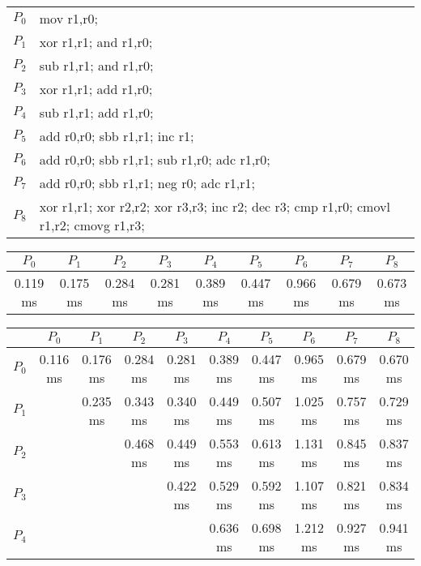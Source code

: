 \documentclass{beamer}
\begin{document}
\begin{frame}
{
\begin{table}
\tiny
\setlength{\tabcolsep}{1mm}
\begin{tabular}{l|l}
$P_0$ & mov r1,r0; \\
$P_1$ & xor r1,r1; and r1,r0; \\
$P_2$ & sub r1,r1; and r1,r0; \\
$P_3$ & xor r1,r1; add r1,r0; \\
$P_4$ & sub r1,r1; add r1,r0; \\
$P_5$ & add r0,r0; sbb r1,r1; inc r1; \\
$P_6$ & add r0,r0; sbb r1,r1; sub r1,r0; adc r1,r0; \\
$P_7$ & add r0,r0; sbb r1,r1; neg r0; adc r1,r1; \\
$P_8$ & xor r1,r1; xor r2,r2; xor r3,r3; inc r2; dec r3; cmp r1,r0; cmovl r1,r2; cmovg r1,r3; \\
\end{tabular}
\end{table}
}
{
\begin{table}
\tiny
\setlength{\tabcolsep}{1mm}
\begin{tabular}{*{9}{c}}
$P_0$    & $P_1$    & $P_2$    & $P_3$    & $P_4$    & $P_5$    & $P_6$    & $P_7$    & $P_8$    \\
\hline
0.119 ms & 0.175 ms & 0.284 ms & 0.281 ms & 0.389 ms & 0.447 ms & 0.966 ms & 0.679 ms & 0.673 ms \\
\end{tabular}
\end{table}
}
{
\begin{table}
\tiny
\setlength{\tabcolsep}{1mm}
\begin{tabular}{l|*{9}{c}}
      & $P_0$    & $P_1$    & $P_2$    & $P_3$    & $P_4$    & $P_5$    & $P_6$    & $P_7$    & $P_8$    \\
\hline
$P_0$ & 0.116 ms & 0.176 ms & 0.284 ms & 0.281 ms & 0.389 ms & 0.447 ms & 0.965 ms & 0.679 ms & 0.670 ms \\
$P_1$ &          & 0.235 ms & 0.343 ms & 0.340 ms & 0.449 ms & 0.507 ms & 1.025 ms & 0.757 ms & 0.729 ms \\
$P_2$ &          &          & 0.468 ms & 0.449 ms & 0.553 ms & 0.613 ms & 1.131 ms & 0.845 ms & 0.837 ms \\
$P_3$ &          &          &          & 0.422 ms & 0.529 ms & 0.592 ms & 1.107 ms & 0.821 ms & 0.834 ms \\
$P_4$ &          &          &          &          & 0.636 ms & 0.698 ms & 1.212 ms & 0.927 ms & 0.941 ms \\

\end{tabular}
\end{table}}
\end{frame}
\end{document}

